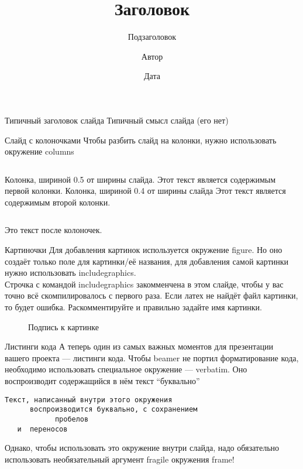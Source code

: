 \documentclass{beamer}      %
\title[Короткий заголовок]{Заголовок}
\subtitle{Подзаголовок}
\author{Автор}
\institute[Организация коротко]
{Организация полностью}
\date[Дата коротко]{Дата} %
\begin{document}
\begin{frame}  
	\titlepage  %
\end{frame}

\begin{frame}{Типичный заголовок слайда}
Типичный смысл слайда (его нет)
\end{frame}

\begin{frame}[fragile]{Слайд с колоночками}
Чтобы разбить слайд на колонки, нужно использовать окружение columns
\begin{columns}
 Колонка, шириной 0.5 от ширины слайда. 
Этот текст является содержимым первой колонки.
 Колонка, шириной 0.4 от ширины слайда
Этот текст является содержимым второй колонки.
\end{columns}
Это текст после колоночек.
\end{frame}

\begin{frame}[fragile]{Картиночки}
Для добавления картинок используется окружение figure. Но оно создаёт только поле для картинки/её названия, для добавления самой картинки нужно использовать includegraphics. \\  %
Строчка с командой includegraphics закомменчена в этом слайде, чтобы у вас точно всё скомпилировалось с первого раза. Если латех не найдёт файл картинки, то будет ошибка.
Раскомментируйте и правильно задайте имя картинки.
\begin{figure}
\centering
\caption{Подпись к картинке}
\end{figure}
\end{frame}


\begin{frame}[fragile]{Листинги кода}
А теперь один из самых важных моментов для презентации вашего проекта --- листинги кода.
Чтобы beamer не портил форматирование кода, необходимо использовать специальное окружение --- verbatim. Оно воспроизводит содержащийся в нём текст ``буквально''
\begin{verbatim}
Текст, написанный внутри этого окружения
      воспроизводится буквально, с сохранением
            пробелов   
   и  переносов
\end{verbatim}
Однако, чтобы использовать это окружение внутри слайда, надо обязательно использовать необязательный аргумент fragile окружения frame!
\end{frame}
\end{document}
